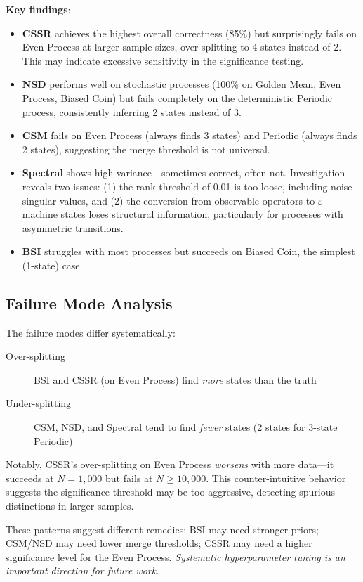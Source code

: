 \documentclass[11pt,a4paper]{report}
\theoremstyle{definition}
\theoremstyle{plain}
\newcommand{\eps}{\varepsilon}
\begin{document}
\textbf{Key findings}:
\begin{itemize}
    \item \textbf{CSSR} achieves the highest overall correctness (85\%) but surprisingly fails on Even Process at larger sample sizes, over-splitting to 4 states instead of 2. This may indicate excessive sensitivity in the significance testing.
    \item \textbf{NSD} performs well on stochastic processes (100\% on Golden Mean, Even Process, Biased Coin) but fails completely on the deterministic Periodic process, consistently inferring 2 states instead of 3.
    \item \textbf{CSM} fails on Even Process (always finds 3 states) and Periodic (always finds 2 states), suggesting the merge threshold is not universal.
    \item \textbf{Spectral} shows high variance---sometimes correct, often not. Investigation reveals two issues: (1) the rank threshold of 0.01 is too loose, including noise singular values, and (2) the conversion from observable operators to $\eps$-machine states loses structural information, particularly for processes with asymmetric transitions.
    \item \textbf{BSI} struggles with most processes but succeeds on Biased Coin, the simplest (1-state) case.
\end{itemize}

\subsection{Failure Mode Analysis}

The failure modes differ systematically:
\begin{description}
    \item[Over-splitting] BSI and CSSR (on Even Process) find \emph{more} states than the truth
    \item[Under-splitting] CSM, NSD, and Spectral tend to find \emph{fewer} states (2 states for 3-state Periodic)
\end{description}

Notably, CSSR's over-splitting on Even Process \emph{worsens} with more data---it succeeds at $N=1{,}000$ but fails at $N \geq 10{,}000$. This counter-intuitive behavior suggests the significance threshold may be too aggressive, detecting spurious distinctions in larger samples.

These patterns suggest different remedies: BSI may need stronger priors; CSM/NSD may need lower merge thresholds; CSSR may need a higher significance level for the Even Process. \emph{Systematic hyperparameter tuning is an important direction for future work.}
\end{document}
